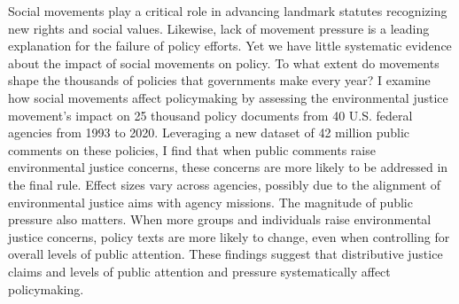 Social movements play a critical role in advancing landmark statutes recognizing new rights and social values. Likewise, lack of movement pressure is a leading explanation for the failure of policy efforts. Yet we have little systematic evidence about the impact of social movements on policy. To what extent do movements shape the thousands of policies that governments make every year? I examine how social movements affect policymaking by assessing the environmental justice movement's impact on 25 thousand policy documents from 40 U.S. federal agencies from 1993 to 2020.  Leveraging a new dataset of 42 million public comments on these policies, I find that when public comments raise environmental justice concerns, these concerns are more likely to be addressed in the final rule. Effect sizes vary across agencies, possibly due to the alignment of environmental justice aims with agency missions.
The magnitude of public pressure also matters. When more groups and individuals raise environmental justice concerns, policy texts are more likely to change, even when controlling for overall levels of public attention. These findings suggest that distributive justice claims and levels of public attention and pressure systematically affect policymaking.
